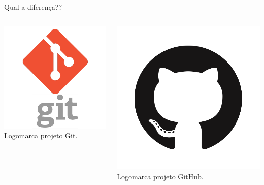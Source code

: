 \documentclass{beamer}
\begin{document}
\begin{frame}{Qual a diferença??}
  \begin{columns}
    \begin{column}{0.4\textwidth}
      \begin{center}
       \includegraphics[height=0.4\paperheight]{git_logo.png} \\
       \tiny{Logomarca projeto Git}.
      \end{center}
    \end{column}
    \begin{column}{0.4\textwidth}
      \begin{center}
      \includegraphics[height=0.4\paperheight]{github_logo.png} \\
       \tiny{Logomarca projeto GitHub}.
      \end{center}
    \end{column}    
  \end{columns}
\end{frame}
\end{document}
